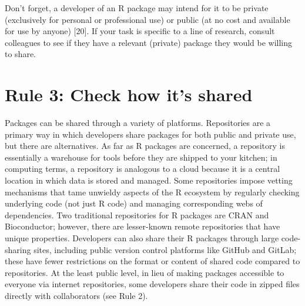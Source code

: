 \documentclass[10pt,letterpaper]{article}
\begin{document}
Don't forget, a developer of an R package may intend for it to be
private (exclusively for personal or professional use) or public (at no
cost and available for use by anyone) {[}20{]}. If your task is specific
to a line of research, consult colleagues to see if they have a relevant
(private) package they would be willing to share.

\hypertarget{rule-3-check-how-its-shared}{%
\section{Rule 3: Check how it's
shared}\label{rule-3-check-how-its-shared}}

Packages can be shared through a variety of platforms. Repositories are
a primary way in which developers share packages for both public and
private use, but there are alternatives. As far as R packages are
concerned, a repository is essentially a warehouse for tools before they
are shipped to your kitchen; in computing terms, a repository is
analogous to a cloud because it is a central location in which data is
stored and managed. Some repositories impose vetting mechanisms that
tame unwieldy aspects of the R ecosystem by regularly checking
underlying code (not just R code) and managing corresponding webs of
dependencies. Two traditional repositories for R packages are CRAN and
Bioconductor; however, there are lesser-known remote repositories that
have unique properties. Developers can also share their R packages
through large code-sharing sites, including public version control
platforms like GitHub and GitLab; these have fewer restrictions on the
format or content of shared code compared to repositories. At the least
public level, in lieu of making packages accessible to everyone via
internet repositories, some developers share their code in zipped files
directly with collaborators (see Rule 2).
\end{document}
